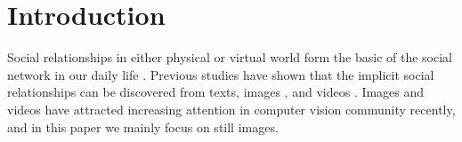 \documentclass{article}
\begin{document}
\section{Introduction}
Social relationships in either physical or virtual world form the basic of the social network in our daily life \cite{DBLP:conf/wacv/BarrCBF14}. Previous studies have shown that the implicit social relationships can be discovered from texts, images \cite{DBLP:conf/iccv/LiWZK17,DBLP:conf/ijcai/WangCRYCL18,DBLP:conf/eccv/WangGLF10,DBLP:conf/iccv/ZhangLLT15}, and videos \cite{DBLP:conf/eccv/DingY10,DBLP:conf/cvpr/RamanathanY013,DBLP:journals/ivc/VinciarelliPB09}. Images and videos have attracted increasing attention in computer vision community recently, and in this paper we mainly focus on still images.
\end{document}
